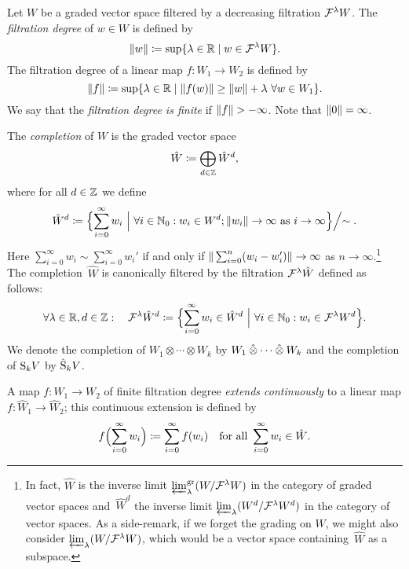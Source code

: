 \documentclass[\MainFolder/Text.tex]{subfiles}
\begin{document}
\begin{Definition}[Completions]\label{Def:Completion}
Let $W$ be a graded vector space filtered by a decreasing filtration $\mathcal{F}^\lambda W$. The \emph{filtration degree} of $w\in W$ is defined by
$$ \| w \| \coloneqq \sup\{ \lambda\in \mathbb{R} \mid w\in \mathcal{F}^\lambda W\}. $$
The filtration degree of a linear map $f: W_1 \rightarrow W_2$ is defined by
$$ \| f \| \coloneqq \sup \{ \lambda\in \mathbb{R} \mid \| f(w) \| \ge \| w \| + \lambda\ \forall w\in W_1\}. $$
We say that the \emph{filtration degree is finite} if $\Norm{f}>-\infty$. Note that $\| 0 \| = \infty$.

The \emph{completion} of $W$ is the graded vector space
$$ \hat{W}\coloneqq \bigoplus_{d\in \mathbb{Z}} \hat{W}^d, $$
where for all $d\in \mathbb{Z}$  we define
$$ \hat{W}^d \coloneqq \Bigl\{ \sum_{i=0}^\infty w_i\ \Bigl|\   \forall i\in \mathbb{N}_0: w_i\in W^d; \| w_i \| \to \infty \text{ as }i\to \infty \Bigl\}\Bigl/\sim.
$$
Here $\sum_{i=0}^\infty w_i \sim \sum_{i=0}^\infty w_i'$ if and only if $\| \sum_{i=0}^n (w_i - w_i') \|\to \infty$ as $n\to \infty$.\footnote{\label{Footnote:Compl}In fact, $\hat{W}$ is the inverse limit $\varprojlim_\lambda^{\mathrm{gr}}(W/\mathcal{F}^\lambda W)$ in the category of graded vector spaces and~$\hat{W}^d$ the inverse limit $\varprojlim_\lambda(W^d/\mathcal{F}^\lambda W^d)$ in the category of vector spaces. As a side-remark, if we forget the grading on $W$, we might also consider $\varprojlim_\lambda (W/\mathcal{F}^\lambda W)$, which would be a vector space containing~$\hat{W}$ as a subspace\vphantom{$W^d$}.}
The completion~$\hat{W}$ is canonically filtered by the filtration $\mathcal{F}^\lambda \hat{W}$ defined as follows:
$$ \forall \lambda\in \mathbb{R}, d\in \mathbb{Z}: \quad \mathcal{F}^\lambda\hat{W}^d\coloneqq \Bigl\{\sum_{i=0}^\infty w_i \in \hat{W}^d \ \Bigr|\ \forall i\in \mathbb{N}_0: w_i \in \mathcal{F}^\lambda W^d \Bigr\}. $$
We denote the completion of $W_1 \otimes \dotsb \otimes W_k$ by $W_1 \COtimes \dotsb \COtimes W_k$ and the completion of $\mathrm{S}_k V$ by $\hat{\mathrm{S}}_k V$. 


A map $f: W_1 \rightarrow W_2$ of finite filtration degree
\emph{extends continuously} to a linear map $f: \hat{W}_1 \rightarrow \hat{W}_2$; this continuous extension is defined by
$$ f\Bigl(\sum_{i=0}^\infty w_i\Bigr)\coloneqq \sum_{i=0}^\infty f(w_i)\quad\text{for all }\sum_{i=0}^\infty w_i \in \hat{W}. $$
\end{Definition}
\end{document}
